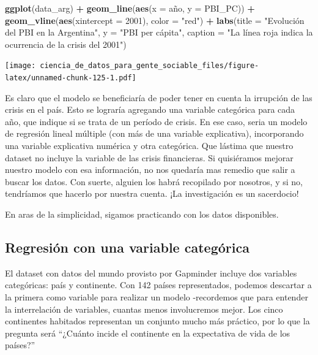 \documentclass[]{book}
\newenvironment{Shaded}{\begin{snugshade}}{\end{snugshade}}
\newcommand{\KeywordTok}[1]{\textcolor[rgb]{0.13,0.29,0.53}{\textbf{#1}}}
\newcommand{\DataTypeTok}[1]{\textcolor[rgb]{0.13,0.29,0.53}{#1}}
\newcommand{\DecValTok}[1]{\textcolor[rgb]{0.00,0.00,0.81}{#1}}
\newcommand{\StringTok}[1]{\textcolor[rgb]{0.31,0.60,0.02}{#1}}
\newcommand{\OperatorTok}[1]{\textcolor[rgb]{0.81,0.36,0.00}{\textbf{#1}}}
\newcommand{\NormalTok}[1]{#1}
\begin{document}
\begin{Shaded}
\begin{Highlighting}[]
\KeywordTok{ggplot}\NormalTok{(data_arg) }\OperatorTok{+}\StringTok{ }
\StringTok{    }\KeywordTok{geom_line}\NormalTok{(}\KeywordTok{aes}\NormalTok{(}\DataTypeTok{x =}\NormalTok{ año, }\DataTypeTok{y =}\NormalTok{ PBI_PC)) }\OperatorTok{+}
\StringTok{    }\KeywordTok{geom_vline}\NormalTok{(}\KeywordTok{aes}\NormalTok{(}\DataTypeTok{xintercept =} \DecValTok{2001}\NormalTok{), }\DataTypeTok{color =} \StringTok{"red"}\NormalTok{) }\OperatorTok{+}
\StringTok{    }\KeywordTok{labs}\NormalTok{(}\DataTypeTok{title =} \StringTok{"Evolución del PBI en la Argentina"}\NormalTok{,}
         \DataTypeTok{y =} \StringTok{"PBI per cápita"}\NormalTok{,}
         \DataTypeTok{caption =} \StringTok{"La línea roja indica la ocurrencia de la crisis del 2001"}\NormalTok{)}
\end{Highlighting}
\end{Shaded}

\texttt{[image: ciencia\_de\_datos\_para\_gente\_sociable\_files/figure-latex/unnamed-chunk-125-1.pdf]}

Es claro que el modelo se beneficiaría de poder tener en cuenta la
irrupción de las crisis en el país. Esto se lograría agregando una
variable categórica para cada año, que indique si se trata de un período
de crisis. En ese caso, seria un modelo de regresión lineal múltiple
(con más de una variable explicativa), incorporando una variable
explicativa numérica y otra categórica. Que lástima que nuestro dataset
no incluye la variable de las crisis financieras. Si quisiéramos mejorar
nuestro modelo con esa información, no nos quedaría mas remedio que
salir a buscar los datos. Con suerte, alguien los habrá recopilado por
nosotros, y si no, tendríamos que hacerlo por nuestra cuenta. ¡La
investigación es un sacerdocio!

En aras de la simplicidad, sigamos practicando con los datos
disponibles.

\subsection{Regresión con una variable
categórica}\label{regresion-con-una-variable-categorica}

El dataset con datos del mundo provisto por Gapminder incluye dos
variables categóricas: país y continente. Con 142 países representados,
podemos descartar a la primera como variable para realizar un modelo
-recordemos que para entender la interrelación de variables, cuantas
menos involucremos mejor. Los cinco continentes habitados representan un
conjunto mucho más práctico, por lo que la pregunta será ``¿Cuánto
incide el continente en la expectativa de vida de los países?''
\end{document}
